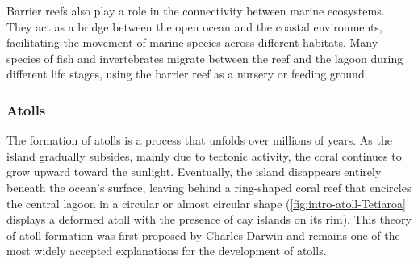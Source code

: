 Barrier reefs also play a role in the connectivity between marine ecosystems. They act as a bridge between the open ocean and the coastal environments, facilitating the movement of marine species across different habitats. Many species of fish and invertebrates migrate between the reef and the lagoon during different life stages, using the barrier reef as a nursery or feeding ground.

\subsubsection{Atolls}
The formation of atolls is a process that unfolds over millions of years. As the island gradually subsides, mainly due to tectonic activity, the coral continues to grow upward toward the sunlight. Eventually, the island disappears entirely beneath the ocean's surface, leaving behind a ring-shaped coral reef that encircles the central lagoon in a circular or almost circular shape (\cref{fig:intro-atoll-Tetiaroa} displays a deformed atoll with the presence of cay islands on its rim). This theory of atoll formation was first proposed by Charles Darwin and remains one of the most widely accepted explanations for the development of atolls.



